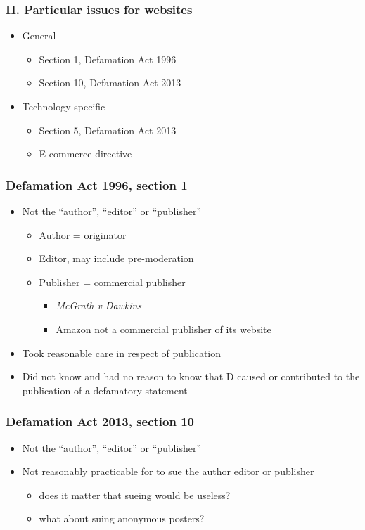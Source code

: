 \documentclass[ignorenonframetext,]{beamer}
\begin{document}
\begin{frame}
\frametitle{II. Particular issues for websites}
\begin{itemize}
\item General
  \begin{itemize}
  \item Section 1, Defamation Act 1996
  \item Section 10, Defamation Act 2013
  \end{itemize}
\item Technology specific
  \begin{itemize}
  \item Section 5, Defamation Act 2013
  \item E-commerce directive
  \end{itemize}
\end{itemize}
\end{frame}

\begin{frame}
\frametitle{Defamation Act 1996, section 1}

\begin{itemize}
\item Not the ``author'', ``editor'' or ``publisher''
  \begin{itemize}
  \item Author = originator
  \item Editor, may include pre-moderation
  \item Publisher = commercial publisher
    \begin{itemize}
    \item {\it McGrath v Dawkins}
    \item Amazon not a commercial publisher of its website
    \end{itemize}
  \end{itemize}
\item Took reasonable care in respect of publication
\item Did not know and had no reason to know that D caused or
  contributed to the publication of a defamatory statement
\end{itemize}

\end{frame}

\begin{frame}
  \frametitle{Defamation Act 2013, section 10}
  \begin{itemize}
  \item Not the ``author'', ``editor'' or ``publisher''
  \item Not reasonably practicable for to sue the author editor or publisher
    \begin{itemize}
    \item does it matter that sueing would be useless?
    \item what about suing anonymous posters?
    \end{itemize}
  \end{itemize}
\end{frame}
\end{document}
